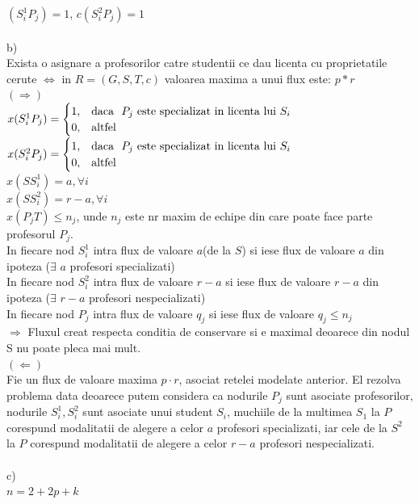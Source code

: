 \documentclass{article}
\begin{document}
$(S_i^1P_j)=1$, $c(S_i^2P_j)=1$\\
\bigskip\\
b) \\
Exista o asignare a profesorilor catre studentii ce dau licenta cu proprietatile cerute $\Leftrightarrow$ in $R=(G,S,T,c)$ valoarea maxima a unui flux este: $p*r$\\
$(\Rightarrow)$\\
$x(S_i^1P_j)=\begin{cases} 1, &\text{daca \($ $P_j$ este specializat in licenta lui $S_i$$\)} \\ 0, &\text{altfel} \end{cases}$\\
$x(S_i^2P_j)=\begin{cases} 1, &\text{daca \($ $P_j$ este specializat in licenta lui $S_i$$\)} \\ 0, &\text{altfel} \end{cases}$\\
$x(SS_i^1)=a,\forall i$\\
$x(SS_i^2)=r-a,\forall i$\\
$x(P_jT) \leq n_j$, unde $n_j$ este nr maxim de echipe din care poate face parte profesorul $P_j$.\\
In fiecare nod $S_i^1$ intra flux de valoare $a$(de la $S$) si iese flux de valoare $a$ din ipoteza ($\exists$ $a$ profesori specializati)\\
In fiecare nod $S_i^2$ intra flux de valoare $r-a$ si iese flux de valoare $r-a$ din ipoteza ($\exists$ $r-a$ profesori nespecializati)\\
In fiecare nod $P_j$ intra flux de valoare $q_j$ si iese flux de valoare $q_j \leq n_j$ \\
$\Rightarrow$ Fluxul creat respecta conditia de conservare si e maximal deoarece din nodul S nu poate pleca mai mult.\\
$(\Leftarrow)$\\
Fie un flux de valoare maxima $p\cdot r$, asociat retelei modelate anterior. El rezolva problema data deoarece putem considera ca nodurile $P_j$ sunt asociate profesorilor, nodurile $S_i^1,S_i^2$ sunt asociate unui student $S_i$, muchiile de la multimea $S_1$ la $P$ corespund modalitatii de alegere a celor $a$ profesori specializati, iar cele de la $S^2$ la $P$ corespund modalitatii de alegere a celor $r-a$ profesori nespecializati.\\
\bigskip\\
c)\\
$n=2+2p+k$\\
\end{document}
